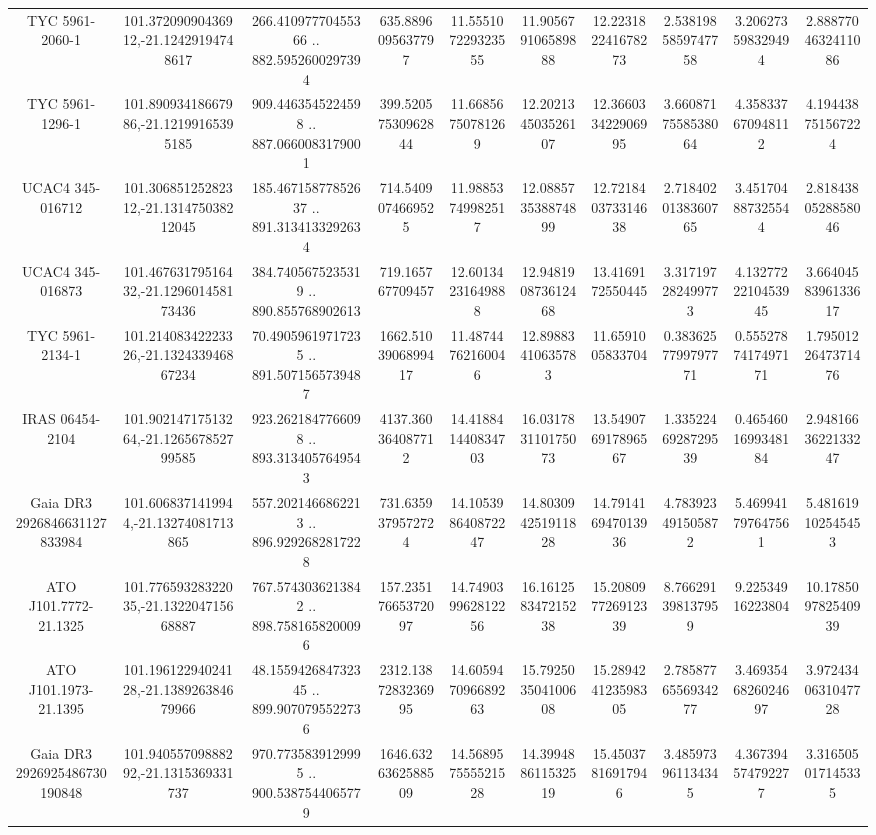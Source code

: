 \begin{table}
\begin{tabular}{cccccccccc}
TYC 5961-2060-1 & 101.37209090436912,-21.12429194748617 & 266.41097770455366 .. 882.5952600297394 & 635.8896095637797 & 11.555107229323555 & 11.905679106589888 & 12.223182241678273 & 2.5381985859747758 & 3.206273598329494 & 2.8887704632411086 \\
TYC 5961-1296-1 & 101.89093418667986,-21.12199165395185 & 909.4463545224598 .. 887.0660083179001 & 399.52057530962844 & 11.66856750781269 & 12.202134503526107 & 12.366033422906995 & 3.6608717558538064 & 4.358337670948112 & 4.194438751567224 \\
UCAC4 345-016712 & 101.30685125282312,-21.131475038212045 & 185.46715877852637 .. 891.3134133292634 & 714.5409074669525 & 11.98853749982517 & 12.088573538874899 & 12.721840373314638 & 2.7184020138360765 & 3.451704887325544 & 2.8184380528858046 \\
UCAC4 345-016873 & 101.46763179516432,-21.129601458173436 & 384.7405675235319 .. 890.855768902613 & 719.165767709457 & 12.60134231649888 & 12.948190873612468 & 13.4169172550445 & 3.317197282499773 & 4.1327722210453945 & 3.6640458396133617 \\
TYC 5961-2134-1 & 101.21408342223326,-21.132433946867234 & 70.49059619717235 .. 891.5071565739487 & 1662.5103906899417 & 11.48744762160046 & 12.89883410635783 & 11.6591005833704 & 0.3836257799797771 & 0.5552787417497171 & 1.7950122647371476 \\
IRAS 06454-2104 & 101.90214717513264,-21.126567852799585 & 923.2621847766098 .. 893.3134057649543 & 4137.360364087712 & 14.418841440834703 & 16.031783110175073 & 13.549076917896567 & 1.3352246928729539 & 0.4654601699348184 & 2.9481663622133247 \\
Gaia DR3 2926846631127833984 & 101.6068371419944,-21.13274081713865 & 557.2021466862213 .. 896.9292682817228 & 731.6359379572724 & 14.105398640872247 & 14.803094251911828 & 14.791416947013936 & 4.783923491505872 & 5.469941797647561 & 5.481619102545453 \\
ATO J101.7772-21.1325 & 101.77659328322035,-21.132204715668887 & 767.5743036213842 .. 898.7581658200096 & 157.23517665372097 & 14.749039962812256 & 16.161258347215238 & 15.208097726912339 & 8.766291398137959 & 9.22534916223804 & 10.178509782540939 \\
ATO J101.1973-21.1395 & 101.19612294024128,-21.138926384679966 & 48.155942684732345 .. 899.9070795522736 & 2312.1387283236995 & 14.605947096689263 & 15.792503504100608 & 15.289424123598305 & 2.7858776556934277 & 3.4693546826024697 & 3.9724340631047728 \\
Gaia DR3 2926925486730190848 & 101.94055709888292,-21.1315369331737 & 970.7735839129995 .. 900.5387544065779 & 1646.6326362588509 & 14.568957555521528 & 14.399488611532519 & 15.45037816917946 & 3.485973961134345 & 4.367394574792277 & 3.316505017145335 \\

\end{tabular}
\end{table}
